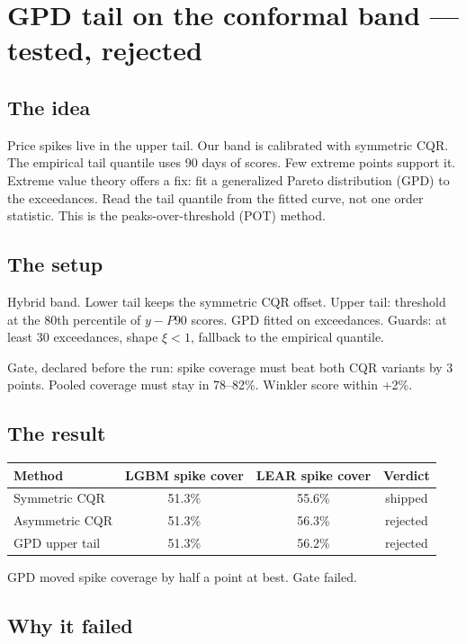 \section{GPD tail on the conformal band --- tested, rejected}

\subsection{The idea}

Price spikes live in the upper tail. Our band is calibrated with
symmetric CQR. The empirical tail quantile uses 90 days of scores.
Few extreme points support it. Extreme value theory offers a fix:
fit a generalized Pareto distribution (GPD) to the exceedances.
Read the tail quantile from the fitted curve, not one order statistic.
This is the peaks-over-threshold (POT) method.

\subsection{The setup}

Hybrid band. Lower tail keeps the symmetric CQR offset. Upper tail:
threshold at the 80th percentile of $y - P90$ scores. GPD fitted on
exceedances. Guards: at least 30 exceedances, shape $\xi < 1$,
fallback to the empirical quantile.

Gate, declared before the run: spike coverage must beat both CQR
variants by 3 points. Pooled coverage must stay in 78--82\%.
Winkler score within +2\%.

\subsection{The result}

\begin{tabular}{lccc}
\hline
Method & LGBM spike cover & LEAR spike cover & Verdict \\
\hline
Symmetric CQR & 51.3\% & 55.6\% & shipped \\
Asymmetric CQR & 51.3\% & 56.3\% & rejected \\
GPD upper tail & 51.3\% & 56.2\% & rejected \\
\hline
\end{tabular}

\vspace{0.5em}
GPD moved spike coverage by half a point at best. Gate failed.

\subsection{Why it failed}

